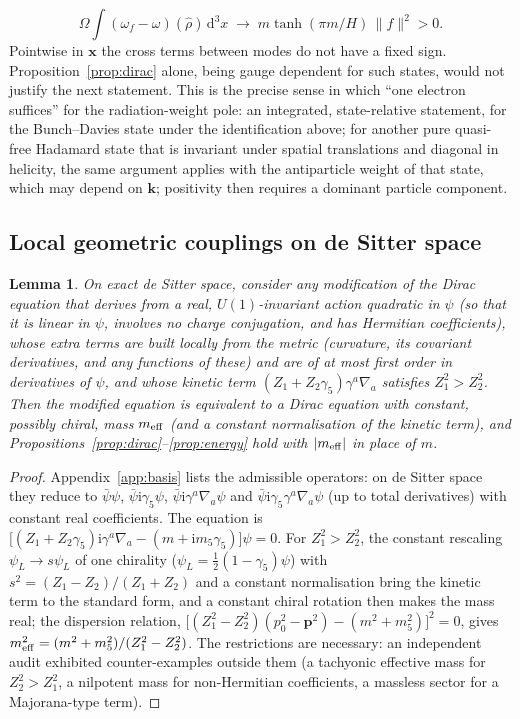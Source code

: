 \documentclass[11pt,a4paper]{article}
\newtheorem{lemma}{Lemma}
\theoremstyle{definition}
\newcommand{\dd}{\mathrm{d}}
\newcommand{\ii}{\mathrm{i}}
\begin{document}
\begin{equation}
\Omega\int(\omega_{f}-\omega)(\hat\rho)\,\dd^{3}x\;\longrightarrow\;m\tanh(\pi m/H)\,\|f\|^{2}>0 .
\end{equation}
Pointwise in $\mathbf{x}$ the cross terms between modes do not have a fixed sign. Proposition~\ref{prop:dirac} alone, being gauge dependent for such states, would not justify the next statement. This is the precise sense in which ``one electron suffices'' for the radiation-weight pole: an integrated, state-relative statement, for the Bunch--Davies state under the identification above; for another pure quasi-free Hadamard state that is invariant under spatial translations and diagonal in helicity, the same argument applies with the antiparticle weight of that state, which may depend on $\mathbf{k}$; positivity then requires a dominant particle component.

\subsection{Local geometric couplings on de Sitter space}
\label{sec:coupling}

\begin{lemma}
\label{lem:coupling}
On exact de Sitter space, consider any modification of the Dirac equation that derives from a real, $U(1)$-invariant action quadratic in $\psi$ (so that it is linear in $\psi$, involves no charge conjugation, and has Hermitian coefficients), whose extra terms are built locally from the metric (curvature, its covariant derivatives, and any functions of these) and are of at most first order in derivatives of $\psi$, and whose kinetic term $(Z_{1}+Z_{2}\gamma_{5})\gamma^{a}\nabla_{a}$ satisfies $Z_{1}^{2}>Z_{2}^{2}$. Then the modified equation is equivalent to a Dirac equation with constant, possibly chiral, mass $m_{\rm eff}$ (and a constant normalisation of the kinetic term), and Propositions~\ref{prop:dirac}--\ref{prop:energy} hold with $|m_{\rm eff}|$ in place of $m$.
\end{lemma}
\begin{proof}
Appendix~\ref{app:basis} lists the admissible operators: on de Sitter space they reduce to $\bar\psi\psi$, $\bar\psi\ii\gamma_{5}\psi$, $\bar\psi\ii\gamma^{a}\nabla_{a}\psi$ and $\bar\psi\ii\gamma_{5}\gamma^{a}\nabla_{a}\psi$ (up to total derivatives) with constant real coefficients. The equation is $\big[(Z_{1}+Z_{2}\gamma_{5})\ii\gamma^{a}\nabla_{a}-(m+\ii m_{5}\gamma_{5})\big]\psi=0$. For $Z_{1}^{2}>Z_{2}^{2}$, the constant rescaling $\psi_{L}\to s\psi_{L}$ of one chirality ($\psi_{L}=\tfrac12(1-\gamma_{5})\psi$) with $s^{2}=(Z_{1}-Z_{2})/(Z_{1}+Z_{2})$ and a constant normalisation bring the kinetic term to the standard form, and a constant chiral rotation then makes the mass real; the dispersion relation, $\big[(Z_{1}^{2}-Z_{2}^{2})(p_{0}^{2}-\mathbf{p}^{2})-(m^{2}+m_{5}^{2})\big]^{2}=0$, gives $m_{\rm eff}^{2}=(m^{2}+m_{5}^{2})/(Z_{1}^{2}-Z_{2}^{2})$. The restrictions are necessary: an independent audit exhibited counter-examples outside them (a tachyonic effective mass for $Z_{2}^{2}>Z_{1}^{2}$, a nilpotent mass for non-Hermitian coefficients, a massless sector for a Majorana-type term).
\end{proof}
\end{document}
